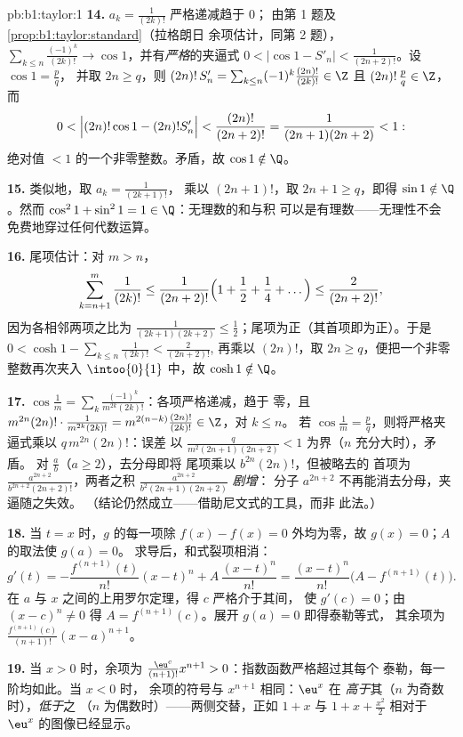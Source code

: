 \begin{solution}{pb:b1:taylor:1}
\textbf{14.} $a_k = \frac{1}{(2k)!}$ 严格递减趋于 $0$；
由第 1 题及\cref{prop:b1:taylor:standard}（拉格朗日
余项估计，同第 2 题），$\sum_{k \leq n}\frac{(-1)^k}{(2k)!}
\to \cos 1$，并有\emph{严格}的夹逼式 $0 < \bigl|\cos 1 -
S'_n\bigr| < \frac{1}{(2n+2)!}$。设 $\cos 1 = \frac pq$，
并取 $2n \geq q$，则 $(2n)!\,S'_n = \sum_{k\leq n} (-1)^k
\frac{(2n)!}{(2k)!} \in \Z$ 且 $(2n)!\,\frac pq \in \Z$，而
\[
0 < \Bigl|(2n)!\cos 1 - (2n)!S'_n\Bigr| <
\frac{(2n)!}{(2n+2)!} = \frac{1}{(2n+1)(2n+2)} < 1 :
\]
绝对值 $< 1$ 的一个非零整数。矛盾，故 $\cos
1 \notin \Q$。

\textbf{15.} 类似地，取 $a_k = \frac{1}{(2k+1)!}$，
乘以 $(2n+1)!$，取 $2n + 1 \geq q$，即得 $\sin 1 \notin
\Q$。然而 $\cos^2 1 + \sin^2 1 = 1 \in \Q$：无理数的和与积
可以是有理数——无理性不会
免费地穿过任何代数运算。

\textbf{16.} 尾项估计：对 $m > n$，
\[
\sum_{k=n+1}^{m} \frac{1}{(2k)!}
\leq \frac{1}{(2n+2)!}\Bigl(1 + \frac12 + \frac14 +
\dots\Bigr) \leq \frac{2}{(2n+2)!} ,
\]
因为各相邻两项之比为 $\frac{1}{(2k+1)(2k+2)} \leq
\frac12$；尾项为正（其首项即为正）。于是 $0 <
\cosh 1 - \sum_{k\leq n}\frac{1}{(2k)!} < \frac{2}{(2n+2)!}$,
再乘以 $(2n)!$，取 $2n \geq q$，便把一个非零
整数再次夹入 $\intoo{0}{1}$ 中，故 $\cosh 1 \notin \Q$。

\textbf{17.} $\cos\frac1m = \sum_k
\frac{(-1)^k}{m^{2k}(2k)!}$：各项严格递减，趋于
零，且 $m^{2n}(2n)!\cdot\frac{1}{m^{2k}(2k)!} =
m^{2(n-k)}\frac{(2n)!}{(2k)!} \in \Z$，对 $k \leq n$。
若 $\cos\frac1m = \frac pq$，则将严格夹逼式乘以
$q\,m^{2n}(2n)!$：误差
以 $\frac{q}{m^2(2n+1)(2n+2)} < 1$ 为界（$n$ 充分大时），矛盾。
对 $\frac ab$（$a \geq 2$），去分母即将
尾项乘以 $b^{2n}(2n)!$，但被略去的
首项为 $\frac{a^{2n+2}}{b^{2n+2}(2n+2)!}$，两者之积
$\frac{a^{2n+2}}{b^2(2n+1)(2n+2)}$ \emph{剧增}：
分子 $a^{2n+2}$ 不再能消去分母，夹逼随之失效。
（结论仍然成立——借助尼文式的工具，而非
此法。）

\textbf{18.} 当 $t = x$ 时，$g$ 的每一项除 $f(x)
- f(x) = 0$ 外均为零，故 $g(x) = 0$；$A$ 的取法使 $g(a) = 0$。
求导后，和式裂项相消：
\[
g'(t) = -\frac{f^{(n+1)}(t)}{n!}(x - t)^n +
A\,\frac{(x-t)^n}{n!}
= \frac{(x-t)^n}{n!}\bigl(A - f^{(n+1)}(t)\bigr) .
\]
在 $a$ 与 $x$ 之间的上用罗尔定理，得 $c$ 严格介于其间，
使 $g'(c) = 0$；由 $(x - c)^n \neq 0$ 得 $A =
f^{(n+1)}(c)$。展开 $g(a) = 0$ 即得泰勒等式，
其余项为 $\frac{f^{(n+1)}(c)}{(n+1)!}(x-a)^{n+1}$。

\textbf{19.} 当 $x > 0$ 时，余项为 $\frac{\eu^{c}}
{(n+1)!}x^{n+1} > 0$：指数函数严格超过其每个
泰勒，每一阶均如此。当 $x < 0$ 时，
余项的符号与 $x^{n+1}$ 相同：$\eu^x$ 在
\emph{高于}其（$n$ 为奇数时），\emph{低于}之
（$n$ 为偶数时）——两侧交替，正如 $1 + x$ 与 $1
+ x + \frac{x^2}{2}$ 相对于 $\eu^x$ 的图像已经显示。


\end{solution}
